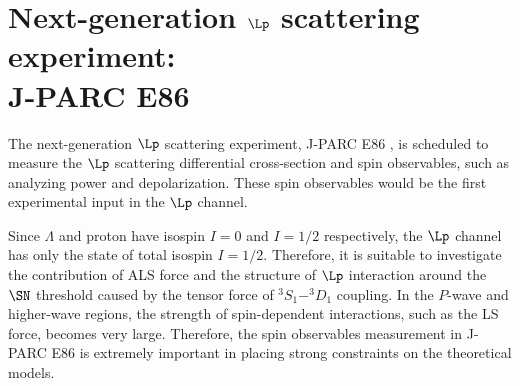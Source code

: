 \section{Next-generation $\Lp$ scattering experiment: \\J-PARC E86}
The next-generation $\Lp$ scattering experiment, J-PARC E86 \cite{Miwa-LpProp}, is scheduled to measure the $\Lp$ scattering differential cross-section and spin observables, such as analyzing power and depolarization. These spin observables would be the first experimental input in the $\Lp$ channel. %

Since $\Lambda$ and proton have isospin $I = 0$ and $I = 1/2$ respectively, the $\Lp$ channel has only the state of total isospin $I = 1/2$. Therefore, it is suitable to investigate the contribution of ALS force and the structure of $\Lp$ interaction around the $\SN$ threshold caused by the tensor force of $^3S_1 - ^3D_1$ coupling. %
In the $P$-wave and higher-wave regions, the strength of spin-dependent interactions, such as the LS force, becomes very large. Therefore, the spin observables measurement in J-PARC E86 is extremely important in placing strong constraints on the theoretical models. 


